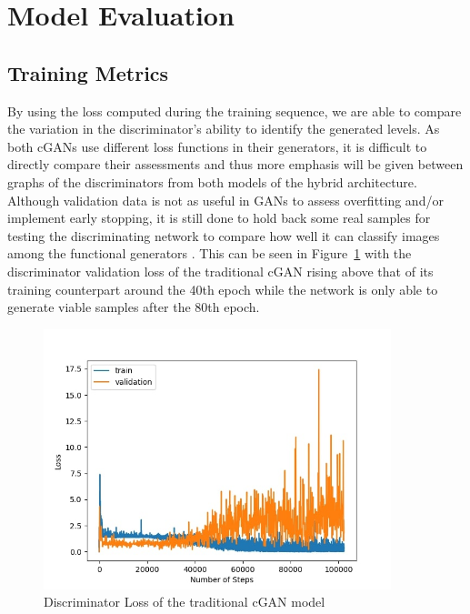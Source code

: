 \documentclass{Configuration_Files/PoliMi3i_thesis}
\begin{document}
\section{Model Evaluation}
\subsection{Training Metrics}
By using the loss computed during the training sequence, we are able to compare the 
variation in the discriminator's ability to identify the generated levels. As both cGANs 
use different loss functions in their generators, it is difficult to directly
compare their assessments and thus more emphasis will be given between graphs of 
the discriminators from both models of the hybrid architecture. Although 
validation data is not as useful in GANs to assess overfitting and/or implement early 
stopping, it is still done to hold back some real samples for testing the discriminating 
network to compare how well it can classify images among the functional generators 
\cite{DeT20}. This can be seen in Figure~\ref{fig:tradloss} with the discriminator validation
 loss of the traditional cGAN rising above that of its training counterpart around the 40th 
epoch while the network is only able to generate viable samples after the 80th epoch.
\begin{figure}[H]
    \centering
    \includegraphics[width=0.9\textwidth]{trad_cgan_loss.jpg}
    \caption{Discriminator Loss of the traditional cGAN model}
    \label{fig:tradloss}
\end{figure}
\end{document}
